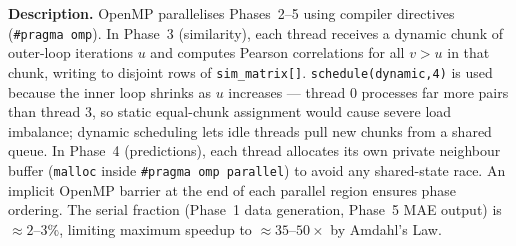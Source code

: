 \documentclass[12pt,a4paper]{article}
\begin{document}
\begin{center}
\end{center}

\begin{mdframed}[style=descbox]
\textbf{Description.}  OpenMP parallelises Phases~2--5 using compiler
directives (\texttt{\#pragma omp}).  In Phase~3 (similarity), each thread
receives a dynamic chunk of outer-loop iterations $u$ and computes Pearson
correlations for all $v > u$ in that chunk, writing to disjoint rows of
\texttt{sim\_matrix[]}.  \texttt{schedule(dynamic,4)} is used because the
inner loop shrinks as $u$ increases — thread 0 processes far more pairs
than thread 3, so static equal-chunk assignment would cause severe load
imbalance; dynamic scheduling lets idle threads pull new chunks from a
shared queue.  In Phase~4 (predictions), each thread allocates its own
private neighbour buffer (\texttt{malloc} inside \texttt{\#pragma omp
parallel}) to avoid any shared-state race.  An implicit OpenMP barrier at
the end of each parallel region ensures phase ordering.  The serial
fraction (Phase~1 data generation, Phase~5 MAE output) is $\approx 2$--$3\%$,
limiting maximum speedup to $\approx 35$--$50\times$ by Amdahl's Law.
\end{mdframed}

\newpage
\end{document}
